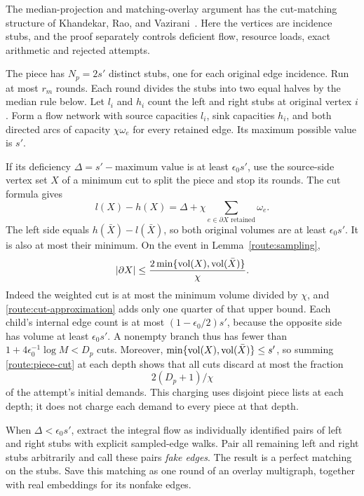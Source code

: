 The median-projection and matching-overlay argument has the cut-matching
structure of Khandekar, Rao, and
Vazirani~\cite[Sections~3--3.2]{KhandekarRaoVazirani2006}.
Here the vertices are incidence stubs, and the proof separately controls
deficient flow, resource loads, exact arithmetic and rejected attempts.

The piece has $N_p=2s'$ distinct stubs, one for each original edge
incidence.  Run at most $r_m$ rounds.  Each round divides the stubs
into two equal halves by the median rule below.  Let $l_i$ and $h_i$
count the left and right stubs at original vertex $i$.  Form a flow
network with source capacities $l_i$, sink capacities $h_i$, and
both directed arcs of capacity $\chi\omega_e$ for every retained
edge.  Its maximum possible value is $s'$.

If its deficiency $\Delta=s'-\text{maximum value}$ is at least
$\epsilon_0s'$, use the source-side vertex set $X$ of a minimum cut
to split the piece and stop its rounds.  The cut formula gives
\begin{equation}\label{route:deficiency-cut}
 l(X)-h(X)=\Delta+
             \chi\sum_{e\in\partial X\text{ retained}}\omega_e.
\end{equation}
The left side equals $h(\bar X)-l(\bar X)$, so both original volumes
are at least $\epsilon_0s'$.  It is also at most their minimum.
On the event in Lemma~\ref{route:sampling},
\begin{equation}\label{route:piece-cut}
 |\partial X|\le
 \frac{2\min\{\operatorname{vol}(X),\operatorname{vol}(\bar X)\}}{\chi}.
\end{equation}
Indeed the weighted cut is at most the minimum volume divided by
$\chi$, and \eqref{route:cut-approximation} adds only one quarter
of that upper bound.  Each child's internal edge count is at most
$(1-\epsilon_0/2)s'$, because the opposite side has volume at least
$\epsilon_0s'$.  A nonempty branch thus has fewer than
$1+4\epsilon_0^{-1}\log M<D_p$ cuts.  Moreover,
$\min\{\operatorname{vol}(X),\operatorname{vol}(\bar X)\}\le s'$, so summing
\eqref{route:piece-cut} at each depth shows that all cuts discard
at most the fraction
\begin{equation}\label{route:cut-loss}
 2(D_p+1)/\chi
\end{equation}
of the attempt's initial demands.  This charging uses disjoint
piece lists at each depth; it does not charge each demand to every
piece at that depth.

When $\Delta<\epsilon_0s'$, extract the integral flow as individually
identified pairs of left and right stubs with explicit sampled-edge
walks.  Pair all remaining left and right stubs arbitrarily and call
these pairs \emph{fake edges}.  The result is a perfect matching on
the stubs.  Save this matching as one round of an overlay multigraph,
together with real embeddings for its nonfake edges.

